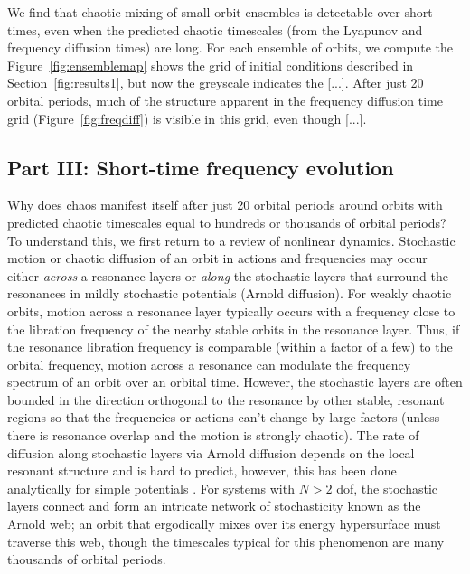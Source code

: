 \documentclass[letterpaper,12pt,preprint]{aastex}
\begin{document}
We find that chaotic mixing of small orbit ensembles is detectable over short times, even when the predicted chaotic timescales (from the Lyapunov and frequency diffusion times) are long. For each ensemble of orbits, we compute the Figure~\ref{fig:ensemblemap} shows the grid of initial conditions described in Section~\ref{fig:results1}, but now the greyscale indicates the [...]. After just 20 orbital periods, much of the structure apparent in the frequency diffusion time grid (Figure~\ref{fig:freqdiff}) is visible in this grid, even though [...].

\subsection{Part III: Short-time frequency evolution}\label{sec:results3}

Why does chaos manifest itself after just 20 orbital periods around orbits with predicted chaotic timescales equal to hundreds or thousands of orbital periods? To understand this, we first return to a review of nonlinear dynamics. Stochastic motion or chaotic diffusion of an orbit in actions and frequencies may occur either \emph{across} a resonance layers or \emph{along} the stochastic layers that surround the resonances in mildly stochastic potentials (Arnold diffusion). For weakly chaotic orbits, motion across a resonance layer typically occurs with a frequency close to the libration frequency of the nearby stable orbits in the resonance layer. Thus, if the resonance libration frequency is comparable (within a factor of a few) to the orbital frequency, motion across a resonance can modulate the frequency spectrum of an orbit over an orbital time. However, the stochastic layers are often bounded in the direction orthogonal to the resonance by other stable, resonant regions so that the frequencies or actions can't change by large factors (unless there is resonance overlap and the motion is strongly chaotic). The rate of diffusion along stochastic layers via Arnold diffusion depends on the local resonant structure and is hard to predict, however, this has been done analytically for simple potentials \citep[e.g.,][]{chirikov??}. For systems with $N>2$ dof, the stochastic layers connect and form an intricate network of stochasticity known as the Arnold web; an orbit that ergodically mixes over its energy hypersurface must traverse this web, though the timescales typical for this phenomenon are many thousands of orbital periods.
\end{document}
